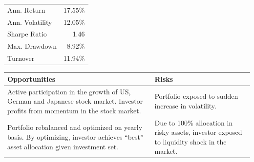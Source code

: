 \documentclass[11pt, parskip=full, DIV=14]{scrreprt}
\begin{document}
\vspace{\abovedisplayskip}
\begin{minipage}{0.65\textwidth}
\end{minipage}
\begin{minipage}{0.35\textwidth}
\begin{tabular}{lr}
\toprule
Ann. Return & 17.55\%\\
Ann. Volatility & 12.05\%\\
Sharpe Ratio & 1.46 \\
Max. Drawdown & 8.92\% \\
Turnover & 11.94\%\\
\bottomrule
\end{tabular}
\end{minipage}



\begin{table}[H]
\begin{tabularx}{\textwidth}{XX}
  \toprule
  \textbf{\textsf{Opportunities}} & \textbf{\textsf{Risks}} \\
  \midrule
Active participation in the growth of US, German and Japanese stock market. Investor profits from momentum in the stock market. &
Portfolio exposed to sudden increase in volatility. \\[1em]
Portfolio rebalanced and optimized on yearly basis. By optimizing, investor achieves “best” asset allocation given investment set. &
Due to 100\% allocation in risky assets, investor exposed to liquidity shock in the market.\\
  \bottomrule
\end{tabularx}
\end{table}
\end{document}
